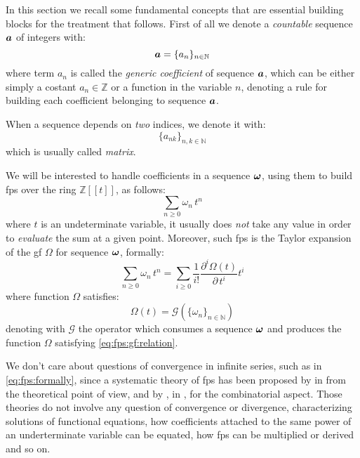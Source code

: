 
In this section we recall some fundamental concepts that are essential building
blocks for the treatment that follows. First of all we denote a \emph{countable}
sequence $\boldsymbol{a}$ of integers with:
\begin{displaymath}
    \boldsymbol{a}=\lbrace a_{n} \rbrace_{n\in\mathbb{N}}
\end{displaymath}
where term $a_{n}$ is called the \emph{generic coefficient} of
sequence $\boldsymbol{a}$, which can be either simply a costant $a_{n}\in\mathbb{Z}$
or a function in the variable $n$, denoting a rule for building each
coefficient belonging to sequence $\boldsymbol{a}$.

When a sequence depends on \emph{two} indices, we denote it with:
\begin{displaymath}
    \lbrace a_{nk} \rbrace_{n,k\in\mathbb{N}}
\end{displaymath}
which is usually called \emph{matrix}.

We will be interested to handle coefficients in a sequence $\boldsymbol{\omega}$,
using them to build \ac{fps} over the ring $\mathbb{Z}[\![t]\!]$, as follows:
\begin{equation}
    \sum_{n\geq0}{\omega_{n}\,t^{n}}
    \label{eq:fps:formally}
\end{equation}
where $t$ is an undeterminate variable, it usually does \emph{not} take
any value in order to \emph{evaluate} the sum at a given point. 
Moreover, such \ac{fps} is the Taylor expansion of the \ac{gf}
$\Omega$ for sequence $\boldsymbol{\omega}$, formally:
\begin{equation}
    \sum_{n\geq0}{\omega_{n}\,t^{n}} = \sum_{i\geq0}{\frac{1}{i!}\frac{
        \partial^{i}\Omega(t)}{\partial\,t^{i}}t^{i}}
    \label{eq:fps:gf:relation}
\end{equation}
where function $\Omega$ satisfies:
\begin{displaymath}
    \Omega(t) = \mathcal{G}\left(\lbrace\omega_{n}\rbrace_{n\in\mathbb{N}}\right)
\end{displaymath}
denoting with $\mathcal{G}$ the operator which consumes a sequence $\boldsymbol{\omega}$
and produces the function $\Omega$ satisfying \autoref{eq:fps:gf:relation}.

We don't care about questions of convergence in infinite series, such as in 
\autoref{eq:fps:formally}, since a systematic theory of \ac{fps} has been proposed
by \citeauthor{niven:1969} in \cite{niven:1969} from the theoretical point of view,
and by \citeauthor{riordan:1964}, in \cite{riordan:1964}, for the combinatorial aspect.
Those theories do not involve any question of convergence or divergence, characterizing
solutions of functional equations, how coefficients attached to the same power of an underterminate
variable can be equated, how \ac{fps} can be multiplied or derived and so on.
